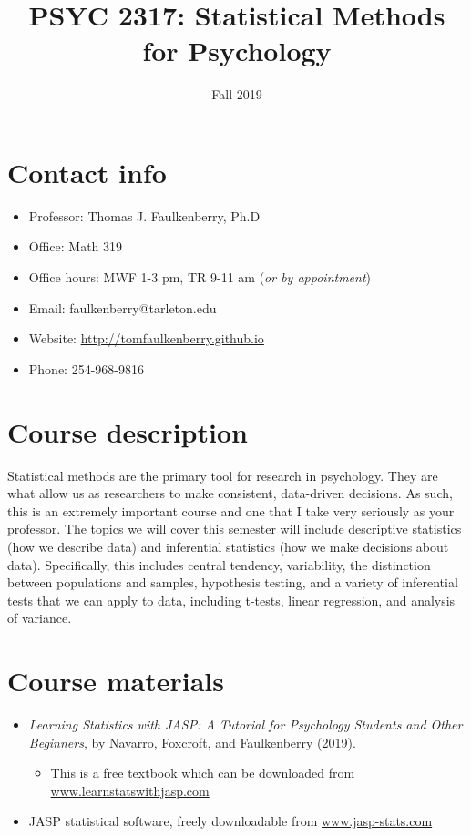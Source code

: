 \documentclass[10pt]{article}
\date{Fall 2019}
\title{PSYC 2317: Statistical Methods for Psychology}
\begin{document}
\maketitle

\section*{Contact info}
\label{sec:org0d92e4a}
\begin{itemize}
\item Professor: Thomas J. Faulkenberry, Ph.D
\item Office: Math 319
\item Office hours: MWF 1-3 pm, TR 9-11 am (\emph{or by appointment})
\item Email: faulkenberry@tarleton.edu
\item Website: \url{http://tomfaulkenberry.github.io}
\item Phone: 254-968-9816
\end{itemize}

\section*{Course description}
\label{sec:org47d5c6e}

Statistical methods are the primary tool for research in psychology. They are what allow us as researchers to make consistent, data-driven decisions.  As such, this is an extremely important course and one that I take very seriously as your professor. The topics we will cover this semester will include descriptive statistics (how we describe data) and inferential statistics (how we make decisions about data).  Specifically, this includes central tendency, variability, the distinction between populations and samples, hypothesis testing, and a variety of inferential tests that we can apply to data, including t-tests, linear regression, and analysis of variance.

\section*{Course materials}
\label{sec:org0412632}
\begin{itemize}
\item \emph{Learning Statistics with JASP: A Tutorial for Psychology Students and Other Beginners}, by Navarro, Foxcroft, and Faulkenberry (2019). 
\begin{itemize}
\item This is a free textbook which can be downloaded from \href{http://learnstatswithjasp.com}{www.learnstatswithjasp.com}
\end{itemize}
\item JASP statistical software, freely downloadable from \href{http://www.jasp-stats.com}{www.jasp-stats.com}
\end{itemize}
\end{document}
